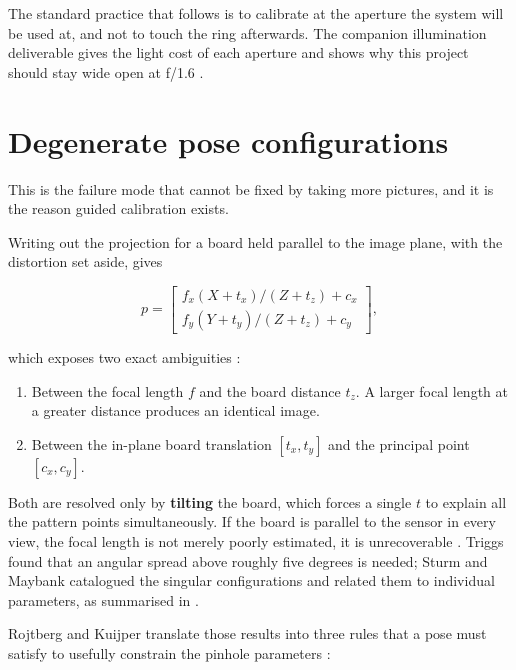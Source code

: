 The standard practice that follows is to calibrate at the aperture the system will be used at, and not to touch the ring afterwards. The companion illumination deliverable gives the light cost of each aperture and shows why this project should stay wide open at f/1.6 \cite{linku_darkroom_illumination}.

\section{Degenerate pose configurations}
\label{sec:degeneracy}

This is the failure mode that cannot be fixed by taking more pictures, and it is the reason guided calibration exists.

Writing out the projection for a board held parallel to the image plane, with the distortion set aside, gives

\begin{equation}
p = \begin{bmatrix} f_x (X + t_x)/(Z + t_z) + c_x \\[2pt] f_y (Y + t_y)/(Z + t_z) + c_y \end{bmatrix} ,
\label{eq:ambiguity}
\end{equation}

which exposes two exact ambiguities \cite{rojtberg2018pose}:

\begin{enumerate}
    \item Between the focal length $f$ and the board distance $t_z$. A larger focal length at a greater distance produces an identical image.
    \item Between the in-plane board translation $[t_x, t_y]$ and the principal point $[c_x, c_y]$.
\end{enumerate}

Both are resolved only by \textbf{tilting} the board, which forces a single $t$ to explain all the pattern points simultaneously. If the board is parallel to the sensor in every view, the focal length is not merely poorly estimated, it is unrecoverable \cite{rojtberg2018pose}. Triggs found that an angular spread above roughly five degrees is needed; Sturm and Maybank catalogued the singular configurations and related them to individual parameters, as summarised in \cite{rojtberg2018pose}.

Rojtberg and Kuijper translate those results into three rules that a pose must satisfy to usefully constrain the pinhole parameters \cite{rojtberg2018pose}:

